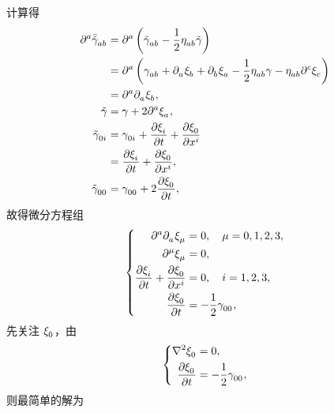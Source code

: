 \begin{xiti}
		\begin{zm}
			计算得
			\begin{equation*}
				\begin{split}
					\tensor{\partial}{^a} \tensor{\bar{\tilde{\gamma}}}{_a_b} &= \tensor{\partial}{^a} \left( \tensor{\tilde{\gamma}}{_a_b} - \frac{1}{2} \tensor{\eta}{_a_b} \tilde{\gamma} \right)\\
					&= \tensor{\partial}{^a} \left( \tensor{\gamma}{_a_b} + \tensor{\partial}{_a} \tensor{\xi}{_b} + \tensor{\partial}{_b} \tensor{\xi}{_a} - \frac{1}{2} \tensor{\eta}{_a_b} \gamma - \tensor{\eta}{_a_b} \tensor{\partial}{^c} \tensor{\xi}{_c} \right)\\
					&= \tensor{\partial}{^a} \tensor{\partial}{_a} \tensor{\xi}{_b},\\
					\tilde{\gamma} &= \gamma + 2 \tensor{\partial}{^a} \tensor{\xi}{_a},\\
					\tensor{\tilde{\gamma}}{_0_i} &= \tensor{\gamma}{_0_i} + \pdv{\tensor{\xi}{_i}}{t} + \pdv{\tensor{\xi}{_0}}{x^i}\\
					&= \pdv{\tensor{\xi}{_i}}{t} + \pdv{\tensor{\xi}{_0}}{x^i},\\
					\tensor{\tilde{\gamma}}{_0_0} &= \tensor{\gamma}{_0_0} + 2 \pdv{\tensor{\xi}{_0}}{t},
				\end{split}
			\end{equation*}
			故得微分方程组
			\begin{equation*}
				\left\{
					\begin{aligned}
						\tensor{\partial}{^a} \tensor{\partial}{_a} \tensor{\xi}{_\mu} &= 0 \qc \mu=0,1,2,3,\\
						\tensor{\partial}{^\mu} \tensor{\xi}{_\mu} &= 0,\\
						\pdv{\tensor{\xi}{_i}}{t} + \pdv{\tensor{\xi}{_0}}{x^i} &= 0 \qc i=1,2,3,\\
						\pdv{\tensor{\xi}{_0}}{t} &= - \frac{1}{2} \tensor{\gamma}{_0_0},
					\end{aligned}
				\right.
			\end{equation*}
			先关注 $\tensor{\xi}{_0}$，由
			\begin{equation*}
				\left\{
					\begin{aligned}
						\nabla^2 \tensor{\xi}{_0} &= 0,\\
						\pdv{\tensor{\xi}{_0}}{t} &= - \frac{1}{2} \tensor{\gamma}{_0_0},
					\end{aligned}
				\right.
			\end{equation*}
			则最简单的解为
			\begin{equation*}

\end{equation*}
\end{zm}
\end{xiti}
